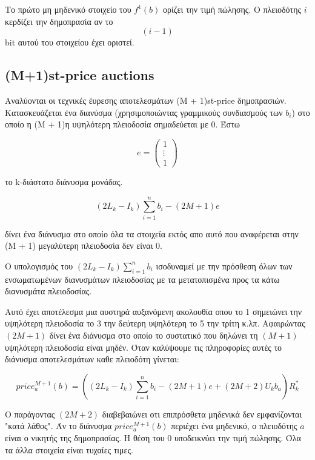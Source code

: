 \documentclass[letterpaper,11pt]{article}
\begin{document}
Το πρώτο μη μηδενικό στοιχείο του $f^1(b)$ ορίζει την τιμή πώλησης. Ο πλειοδότης $i$ κερδίζει την δημοπρασία αν το $$(i − 1)$$ bit αυτού του
στοιχείου έχει οριστεί.

\subsection{(M+1)st-price auctions} Αναλύονται οι τεχνικές έυρεσης αποτελεσμάτων (M + 1)st-price δημοπρασιών. Κατασκευάζεται ένα διανύσμα
(χρησιμοποιώντας γραμμικούς συνδιασμούς των $b_i$) στο οποίο η (M + 1)η υψηλότερη πλειοδοσία σημαδεύεται με 0. Έστω

\begin{displaymath}
	e = 
	\left ( \begin{array}{c}
		1 \\
		\vdots \\
		1
	\end{array} \right)
\end{displaymath}

το k-διάστατο διάνυσμα μονάδας.

\begin{displaymath}
	(2L_k - I_k) \sum_{i=1}^{n} b_i - (2M+1)e
\end{displaymath}

δίνει ένα διάνυσμα στο οποίο όλα τα στοιχεία εκτός απο αυτό που αναφέρεται στην (M + 1) μεγαλύτερη πλειοδοσία δεν είναι 0.

Ο υπολογισμός του $(2L_k − I_k) \sum_{i=1}^{n} b_i$ ισοδυναμεί με την πρόσθεση όλων των ενσωματωμένων διανυσμάτων πλειοδοσίας με τα μετατοπισμένα
προς τα κάτω διανυσμάτα πλειοδοσίας.

Αυτό έχει αποτέλεσμα μια αυστηρά αυξανόμενη ακολουθία οπου το 1 σημειώνει την υψηλότερη πλειοδοσία το 3 την δεύτερη υψηλότερη το 5 την τρίτη κ.λπ.
Αφαιρώντας $(2M+1)$ δίνει ένα διάνυσμα στο οποίο το συστατικό που δηλώνει τη $(M + 1)$ υψηλότερη πλειοδοσία είναι μηδέν. Όταν καλύψουμε τις
πληροφορίες αυτές το διάνυσμα αποτελεσμάτων καθε πλειοδότη γίνεται:

\begin{displaymath}
	price_{a}^{M+1}(b) = \left ( (2L_k - I_k) \sum_{i=1}^{n} b_i - (2M+1)e + (2M+2)U_kb_a \right ) R^*_k
\end{displaymath}

Ο παράγοντας $(2M+2)$ διαβεβαιώνει οτι επιπρόσθετα μηδενικά δεν εμφανίζονται "κατά λάθος". Άν το διάνυσμα $price_{a}^{M+1}(b)$ περιέχει ένα
μηδενικό, ο πλειοδότης $a$ είναι ο νικητής της δημοπρασίας. Η θέση του 0 υποδεικνύει την τιμή πώλησης. Όλα τα άλλα στοιχεία είναι τυχαίες τιμες.
\end{document}
